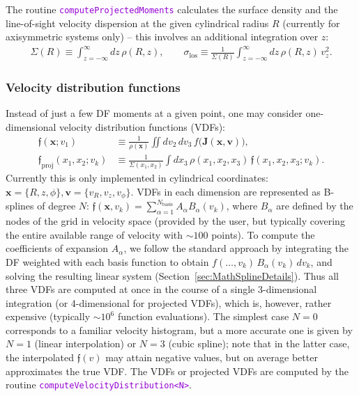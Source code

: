 \documentclass[12pt]{article}
\newcommand{\ttt}[1]{\textcolor{darkviolet}{\texttt{#1}}}
\newcommand{\bv}{\boldsymbol{v}}
\newcommand{\bx}{\boldsymbol{x}}
\newcommand{\bJ}{\boldsymbol{J}}
\begin{document}
The routine \ttt{computeProjectedMoments} calculates the surface density and the line-of-sight velocity dispersion at the given cylindrical radius $R$ (currently for axisymmetric systems only) -- this involves an additional integration over $z$:
\begin{align*}
\Sigma(R) \equiv \int_{z=-\infty}^\infty dz\, \rho(R,z), \qquad
\sigma_\mathrm{los} \equiv \frac{1}{\Sigma(R)} \int_{z=-\infty}^\infty dz\, \rho(R,z)\, v_z^2 .
\end{align*}

\subsubsection{Velocity distribution functions}  \label{sec:VDF}

Instead of just a few DF moments at a given point, one may consider one-dimensional velocity distribution functions (VDFs):
\begin{align*}
\mathfrak{f}(\bx;v_1) &\equiv \frac{1}{\rho(\bx)} \iint dv_2\,dv_3\, f\big(\bJ(\bx,\bv)\big) ,\\
\mathfrak{f}_\mathrm{proj}(x_1,x_2;v_k) &\equiv \frac{1}{\Sigma(x_1,x_2)} \int dx_3\, \rho(x_1,x_2,x_3)\,\mathfrak{f}(x_1,x_2,x_3;v_k) .
\end{align*}
Currently this is only implemented in cylindrical coordinates: $\bx=\{R,z,\phi\}, \bv=\{v_R,v_z,v_\phi\}$.
VDFs in each dimension are represented as B-splines of degree $N$: $\mathfrak{f}(\bx, v_k) = \sum_{\alpha=1}^{N_\mathrm{basis}} A_\alpha B_\alpha(v_k)$, where $B_\alpha$ are defined by the nodes of the grid in velocity space (provided by the user, but typically covering the entire available range of velocity with $\sim 100$ points). To compute the coefficients of expansion $A_\alpha$, we follow the standard approach by integrating the DF weighted with each basis function to obtain $f(\dots,v_k)\,B_\alpha(v_k)\,dv_k$, and solving the resulting linear system (Section~\ref{sec:MathSplineDetails}). Thus all three VDFs are computed at once in the course of a single 3-dimensional integration (or 4-dimensional for projected VDFs), which is, however, rather expensive (typically $\sim 10^6$ function evaluations). The simplest case $N=0$ corresponds to a familiar velocity histogram, but a more accurate one is given by $N=1$ (linear interpolation) or $N=3$ (cubic spline); note that in the latter case, the interpolated $\mathfrak{f}(v)$ may attain negative values, but on average better approximates the true VDF.
The VDFs or projected VDFs are computed by the routine \ttt{computeVelocityDistribution<N>}.
\end{document}
